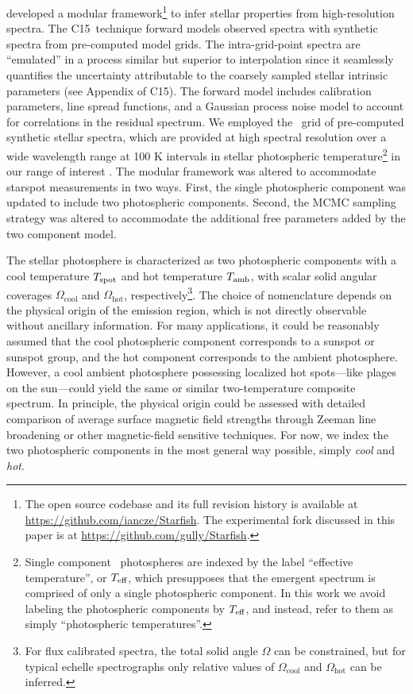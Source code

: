 \documentclass[twocolumn]{emulateapj}%
\newcommand{\iancze}{{\sc C15}}
\begin{document}
\citet[hereafter \iancze]{czekala15} developed a modular framework\footnote{The open source codebase and its full revision history is available at \url{https://github.com/iancze/Starfish}.  The experimental fork discussed in this paper is at \url{https://github.com/gully/Starfish}.  } to infer stellar properties from high-resolution spectra.  The \iancze\ technique forward models observed spectra with synthetic spectra from pre-computed model grids.  The intra-grid-point spectra are ``emulated'' in a process similar but superior to interpolation since it seamlessly quantifies the uncertainty attributable to the coarsely sampled stellar intrinsic parameters (see Appendix of \iancze).  The forward model includes calibration parameters, line spread functions, and a Gaussian process noise model to account for correlations in the residual spectrum.  We employed the \PHOENIX\ grid of pre-computed synthetic stellar spectra, which are provided at high spectral resolution over a wide wavelength range at 100 K intervals in stellar photospheric temperature\footnote{Single component \PHOENIX\ photospheres are indexed by the label ``effective temperature'', or $T_\textrm{eff}$, which presupposes that the emergent spectrum is comprised of only a single photospheric component.  In this work we avoid labeling the photospheric components by $T_\textrm{eff}$, and instead, refer to them as simply ``photospheric temperatures''.} in our range of interest \citep{husser13}.  The modular framework was altered to accommodate starspot measurements in two ways. First, the single photospheric component was updated to include two photospheric components.  Second, the MCMC sampling strategy was altered to accommodate the additional free parameters added by the two component model.  

The stellar photosphere is characterized as two photospheric components with a cool temperature $T_\textrm{spot}$ and hot temperature $T_\textrm{amb}$, with scalar solid angular coverages $\Omega_{\mathrm{cool}}$ and $\Omega_{\mathrm{hot}}$, respectively\footnote{For flux calibrated spectra, the total solid angle $\Omega$ can be constrained, but for typical echelle spectrographs only relative values of $\Omega_{\mathrm{cool}}$ and $\Omega_{\mathrm{hot}}$ can be inferred.}.  
The choice of nomenclature depends on the physical origin of the emission region, which is not directly observable without ancillary information.  For many applications, it could be reasonably assumed that the cool photospheric component corresponds to a sunspot or sunspot group, and the hot component corresponds to the ambient photosphere.  However, a cool ambient photosphere possessing localized hot spots---like plages on the sun---could yield the same or similar two-temperature composite spectrum.  In principle, the physical origin could be assessed with detailed comparison of average surface magnetic field strengths through Zeeman line broadening or other magnetic-field sensitive techniques.  For now, we index the two photospheric components in the most general way possible, simply \emph{cool} and \emph{hot}. 
\end{document}
